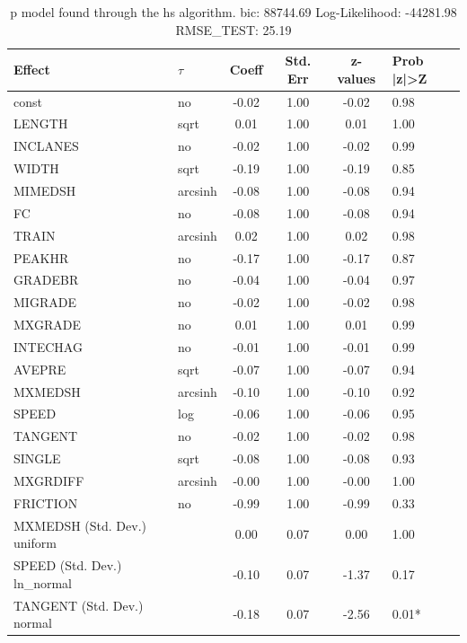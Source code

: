 \begin{table}
	\caption{p model found through the hs algorithm. bic: 88744.69 Log-Likelihood: -44281.98 RMSE_TEST: 25.19}
	\begin{center}
		\begin{tabular}{|l|l|c|c|c|l|}
			\hline
			Effect & $\tau$ & Coeff & Std. Err & z-values & Prob |z|>Z \\
			\hline
			const & no & -0.02 & 1.00 & -0.02 & 0.98 \\
			\hline
			LENGTH & sqrt & 0.01 & 1.00 & 0.01 & 1.00 \\
			\hline
			INCLANES & no & -0.02 & 1.00 & -0.02 & 0.99 \\
			\hline
			WIDTH & sqrt & -0.19 & 1.00 & -0.19 & 0.85 \\
			\hline
			MIMEDSH & arcsinh & -0.08 & 1.00 & -0.08 & 0.94 \\
			\hline
			FC & no & -0.08 & 1.00 & -0.08 & 0.94 \\
			\hline
			TRAIN & arcsinh & 0.02 & 1.00 & 0.02 & 0.98 \\
			\hline
			PEAKHR & no & -0.17 & 1.00 & -0.17 & 0.87 \\
			\hline
			GRADEBR & no & -0.04 & 1.00 & -0.04 & 0.97 \\
			\hline
			MIGRADE & no & -0.02 & 1.00 & -0.02 & 0.98 \\
			\hline
			MXGRADE & no & 0.01 & 1.00 & 0.01 & 0.99 \\
			\hline
			INTECHAG & no & -0.01 & 1.00 & -0.01 & 0.99 \\
			\hline
			AVEPRE & sqrt & -0.07 & 1.00 & -0.07 & 0.94 \\
			\hline
			MXMEDSH & arcsinh & -0.10 & 1.00 & -0.10 & 0.92 \\
			\hline
			SPEED & log & -0.06 & 1.00 & -0.06 & 0.95 \\
			\hline
			TANGENT & no & -0.02 & 1.00 & -0.02 & 0.98 \\
			\hline
			SINGLE & sqrt & -0.08 & 1.00 & -0.08 & 0.93 \\
			\hline
			MXGRDIFF & arcsinh & -0.00 & 1.00 & -0.00 & 1.00 \\
			\hline
			FRICTION & no & -0.99 & 1.00 & -0.99 & 0.33 \\
			\hline
			MXMEDSH (Std. Dev.) uniform &  & 0.00 & 0.07 & 0.00 & 1.00 \\
			\hline
			SPEED (Std. Dev.) ln_normal &  & -0.10 & 0.07 & -1.37 & 0.17 \\
			\hline
			TANGENT (Std. Dev.) normal &  & -0.18 & 0.07 & -2.56 & 0.01* \\

\end{tabular}
\end{center}
\end{table}
